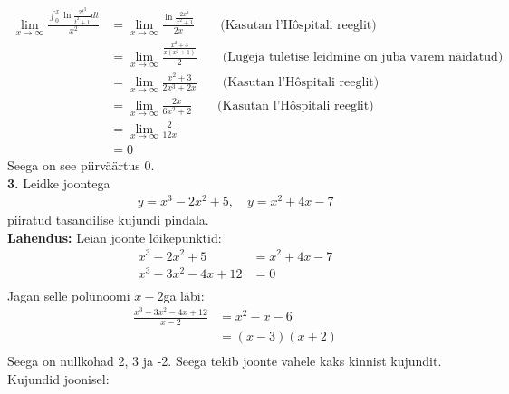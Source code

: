 \documentclass{article}
\begin{document}
\begin{equation*}
\begin{aligned}
\lim_{x\to\infty}\frac{\int_0^x\ln\frac{2t^3}{t^2+1}dt}{x^2}&=\lim_{x\to\infty}\frac{\ln\frac{2x^3}{x^2+1}}{2x}\qquad\text{(Kasutan l'H\^ospitali reeglit)}\\
&=\lim_{x\to\infty}\frac{\frac{x^2+3}{x(x^2+1)}}{2}\qquad\text{(Lugeja tuletise leidmine on juba varem n\"aidatud)}\\
&=\lim_{x\to\infty}\frac{x^2+3}{2x^3+2x}\qquad\text{(Kasutan l'H\^ospitali reeglit)}\\
&=\lim_{x\to\infty}\frac{2x}{6x^2+2}\qquad\text{(Kasutan l'H\^ospitali reeglit)}\\
&=\lim_{x\to\infty}\frac{2}{12x}\\
&=0
\end{aligned}
\end{equation*}
Seega on see piirv\"a\"artus 0.
\pagebreak\\
\textbf{3.} Leidke joontega
\begin{gather*}
y=x^3-2x^2+5,\quad y=x^2+4x-7
\end{gather*}
piiratud tasandilise kujundi pindala.\\
\textbf{Lahendus:} Leian joonte l\~oikepunktid:
\begin{equation*}
\begin{aligned}
x^3-2x^2+5&=x^2+4x-7\\
x^3-3x^2-4x+12&=0\\
\end{aligned}
\end{equation*}
Jagan selle pol\"unoomi $x-2$ga l\"abi:
\begin{equation*}
\begin{aligned}
\frac{x^3-3x^2-4x+12}{x-2}&=x^2-x-6\\
&=(x-3)(x+2)\\
\end{aligned}
\end{equation*}
Seega on nullkohad 2, 3 ja -2. Seega tekib joonte vahele kaks kinnist kujundit.\\
Kujundid joonisel:\\
\\
\end{document}
